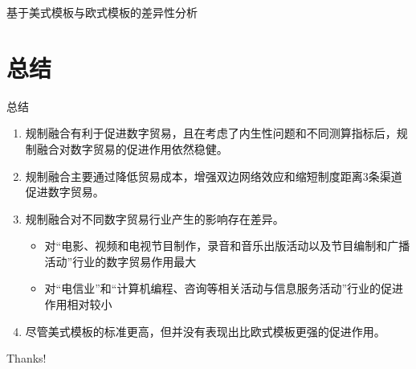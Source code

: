 \documentclass{beamer}
\begin{document}
\begin{frame}{基于美式模板与欧式模板的差异性分析}
    \centering
\end{frame}


\section{总结}
\begin{frame}{总结}
    \begin{enumerate}
        \item 规制融合有利于促进数字贸易，且在考虑了内生性问题和不同测算指标后，规制融合对数字贸易的促进作用依然稳健。
        \item 规制融合主要通过降低贸易成本，增强双边网络效应和缩短制度距离3条渠道促进数字贸易。
        \item 规制融合对不同数字贸易行业产生的影响存在差异。
        \begin{itemize}
            \item 对“电影、视频和电视节目制作，录音和音乐出版活动以及节目编制和广播活动”行业的数字贸易作用最大
            \item 对“电信业”和“计算机编程、咨询等相关活动与信息服务活动”行业的促进作用相对较小
        \end{itemize}
        \item 尽管美式模板的标准更高，但并没有表现出比欧式模板更强的促进作用。
    \end{enumerate}
\end{frame}

\begin{frame}
    \begin{center}
        {\Huge\calligra Thanks!}
    \end{center}
\end{frame}
\end{document}
